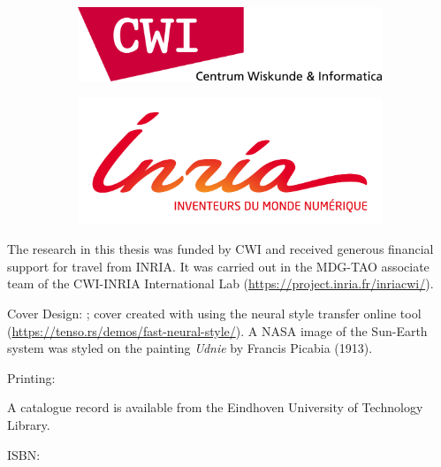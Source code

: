 
\begin{figure}
    \centering
    \begin{subfigure}[b]{0.6\textwidth}
      \centering
      \includegraphics[width=\textwidth]{figures/cwi-logo}
    \end{subfigure}
    \hfill
    \begin{subfigure}[b]{0.6\textwidth}
      \centering
      \includegraphics[width=\textwidth]{figures/inria-logo}
    \end{subfigure}
\end{figure}

\vspace{\fill}

{\noindent
The research in this thesis was funded by CWI and received generous financial support for travel 
from INRIA. It was carried out in the MDG-TAO associate team of the CWI-INRIA International Lab 
(\url{https://project.inria.fr/inriacwi/}).
}

\vspace{\fill}

{
\noindent
Cover Design: \coverdesign; cover created with using the neural style 
transfer online tool (\url{https://tenso.rs/demos/fast-neural-style/}). A NASA 
image of the Sun-Earth system was styled on the painting \textit{Udnie} 
by Francis Picabia (1913).  

\vspace{\baselineskip}

\noindent
Printing: \printingcompany

\vspace{\baselineskip}

\noindent
A catalogue record is available from the Eindhoven University of Technology Library. 

\vspace{\baselineskip}

\noindent
ISBN: \isbncode
}

